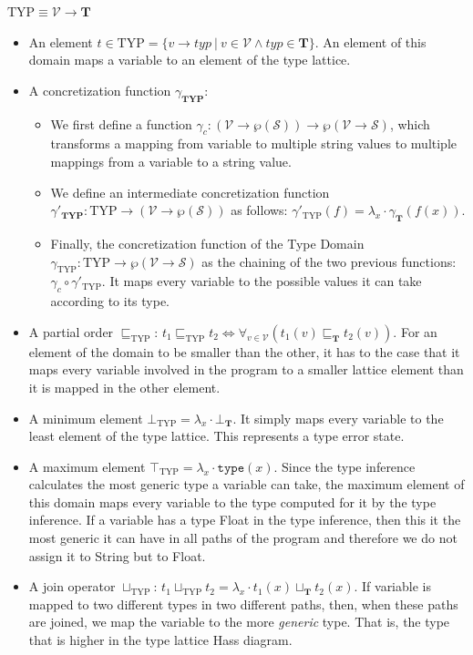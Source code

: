 \documentclass[10pt]{report}
\begin{document}
\begin{center}
	$ \mathrm{TYP} \equiv \mathcal{V} \longrightarrow \mathbf{T}$
\end{center} 
\begin{itemize}
	\item An element $ t \in \mathrm{TYP} = \lbrace v \rightarrow typ\ \vert\ v \in \mathcal{V} \wedge typ \in \mathbf{T}  \rbrace $. An element of this domain maps a variable to an element of the type lattice. 
	\item A concretization function $ \gamma_{\mathbf{TYP}} $:
	\begin{itemize} 
		\item We first define a function $ \gamma_{c}: (\mathcal{V} \rightarrow \wp(\mathcal{S})) \longrightarrow \wp(\mathcal{V} \rightarrow \mathcal{S}) $, which transforms a mapping from variable to multiple string values to multiple mappings from a variable to a string value. 
		\item We define an intermediate concretization function $ \gamma'_{\mathbf{TYP}}: \mathrm{TYP} \longrightarrow (\mathcal{V} \rightarrow \wp(\mathcal{S})) $ as follows: $ \gamma'_{\mathrm{TYP}}(f) = \lambda_{x}\cdot \gamma_{\mathbf{T}}(f(x)) $. 
		\item Finally, the concretization function of the Type Domain $ \gamma_{\mathrm{TYP}}: \mathrm{TYP} \longrightarrow \wp(\mathcal{V} \rightarrow \mathcal{S}) $ as the chaining of the two previous functions: $ \gamma_{c} \circ \gamma'_{\mathrm{TYP}}$. It maps every variable to the possible values it can take according to its type. 
	\end{itemize}
\item A partial order $ \sqsubseteq_{\mathrm{TYP}} $: $ t_{1} \sqsubseteq_{\mathrm{TYP}} t_{2} \Longleftrightarrow \forall_{v \in \mathcal{V}} (t_{1}(v) \sqsubseteq_{\mathbf{T}} t_{2}(v))$. For an element of the domain to be smaller than the other, it has to the case that it maps every variable involved in the program to a smaller lattice element than it is mapped in the other element. 
\item A minimum element $ \bot_{\mathrm{TYP}} = \lambda_{x} \cdot \bot_{\mathbf{T}}$. It simply maps every variable to the least element of the type lattice. This represents a type error state. 
\item A maximum element $ \top_{\mathrm{TYP}} = \lambda_{x} \cdot \mathtt{type}(x) $. Since the type inference calculates the most generic type a variable can take, the maximum element of this domain maps every variable to the type computed for it by the type inference. If a variable has a type Float in the type inference, then this it the most generic it can have in all paths of the program and therefore we do not assign it to String but to Float. 
\item A join operator $ \sqcup_{\mathrm{TYP}} $: $ t_{1} \sqcup_{\mathrm{TYP}} t_{2} = \lambda_{x}\cdot t_{1}(x) \sqcup_{\mathbf{T}} t_{2}(x) $. If variable is mapped to two different types in two different paths, then, when these paths are joined, we map the variable to the more \textit{generic} type. That is, the type that is higher in the type lattice Hass diagram. 


\end{itemize}
\end{document}
